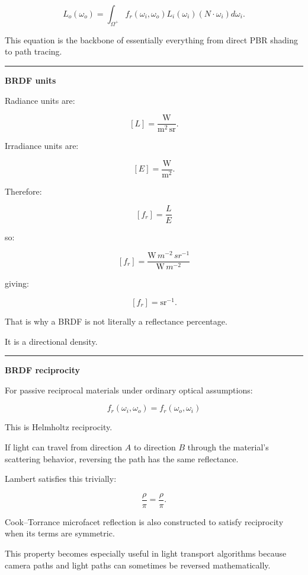 \[
\boxed{
L_o(\omega_o)
=
\int_{\Omega^+}
f_r(\omega_i,\omega_o)
L_i(\omega_i)
(N\cdot\omega_i)
d\omega_i.
}
\]

This equation is the backbone of essentially everything from direct PBR shading to path tracing.

\begin{center}\rule{0.5\linewidth}{0.5pt}\end{center}

\textbf{BRDF units}

Radiance units are:

\[
[L]
=
\frac{\mathrm W}
{\mathrm{m^2\,sr}}.
\]

Irradiance units are:

\[
[E]
=
\frac{\mathrm W}{\mathrm{m^2}}.
\]

Therefore:

\[
[f_r]
=
\frac{L}{E}
\]

so:

\[
[f_r]
=
\frac{
\mathrm W\,m^{-2}\,sr^{-1}
}{
\mathrm W\,m^{-2}
}
\]

giving:

\[
\boxed{
[f_r]=\mathrm{sr}^{-1}.
}
\]

That is why a BRDF is not literally a reflectance percentage.

It is a directional density.

\begin{center}\rule{0.5\linewidth}{0.5pt}\end{center}

\textbf{BRDF reciprocity}

For passive reciprocal materials under ordinary optical assumptions:

\[
\boxed{
f_r(\omega_i,\omega_o)
=
f_r(\omega_o,\omega_i)
}
\]

This is Helmholtz reciprocity.

If light can travel from direction \(A\) to direction \(B\) through the material's scattering behavior, reversing the path has the same reflectance.

Lambert satisfies this trivially:

\[
\frac{\rho}{\pi}
=
\frac{\rho}{\pi}.
\]

Cook--Torrance microfacet reflection is also constructed to satisfy reciprocity when its terms are symmetric.

This property becomes especially useful in light transport algorithms because camera paths and light paths can sometimes be reversed mathematically.

